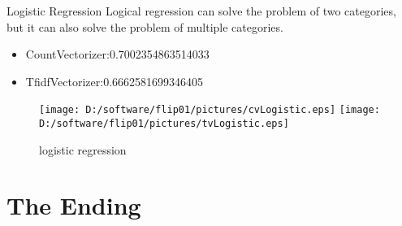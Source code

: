 \documentclass[
 size=12pt,
 paper=smartboard, %
 mode=present, %
 display=slides, %
style=tuliplab,
pauseslide,
fleqn,leqno]{powerdot}
\begin{document}
\begin{slide}[toc=,bm=]{Logistic Regression}
  \hspace{0.5cm}  Logical regression can solve the problem of two categories, but it can also solve the problem of multiple categories.
  \begin{itemize}
    \item CountVectorizer:0.7002354863514033 \ 

    \item TfidfVectorizer:0.6662581699346405
    \end{itemize}
    \begin{figure}[ht]%
      \centering%
      \texttt{[image: D:/software/flip01/pictures/cvLogistic.eps]}
      \texttt{[image: D:/software/flip01/pictures/tvLogistic.eps]}
      \caption{logistic regression}%
      \end{figure}
 
    \end{slide}

\section{The Ending}


\end{document}
